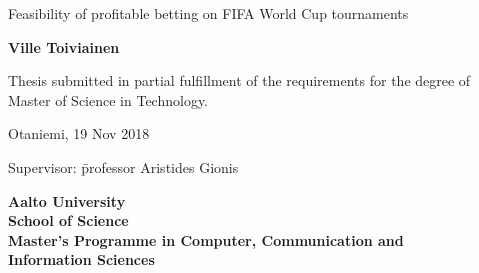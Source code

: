 {\parindent0pt %
\begin{spacing}{1.1}

 {\sffamily{}}
\end{spacing}

\vspace{12.7mm}

\begin{spacing}{1.63}
{\fontsize{17.8pt}{17.8pt}\selectfont Feasibility of profitable betting on FIFA World Cup tournaments}
\end{spacing}

\vspace{10.6mm}

{\fontsize{13.9pt}{13.9pt}\bfseries\sffamily\lsstyle Ville Toiviainen}

\vfill

{\fontsize{10.3pt}{10.3pt}\sffamily\lsstyle\raggedright
\begin{spacing}{1.06}

Thesis submitted in partial fulfillment of the requirements for the
degree of Master of Science in Technology.

Otaniemi, 19 Nov 2018

\begin{tabbing}
Supervisor:\hspace{6mm} \= professor Aristides Gionis \\
\end{tabbing}
\vspace{-4mm}
\end{spacing}
} %

\vspace{11.5mm}

\begin{spacing}{.9}
{\bfseries\sffamily\lsstyle Aalto University \\
School of Science \\
Master’s Programme in Computer, Communication and \\Information Sciences}
\end{spacing}
} %




